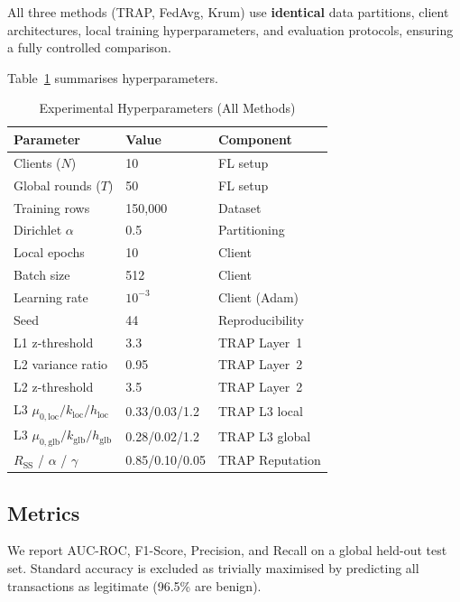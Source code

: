\documentclass[journal]{IEEEtran}
\newcommand{\sysname}{TRAP}
\begin{document}
All three methods (TRAP, FedAvg, Krum) use \textbf{identical} data
partitions, client architectures, local training hyperparameters, and
evaluation protocols, ensuring a fully controlled comparison.

Table~\ref{tab:hyperparams} summarises hyperparameters.

\begin{table}[!t]
\renewcommand{\arraystretch}{1.2}
\caption{Experimental Hyperparameters (All Methods)}
\label{tab:hyperparams}
\centering
\begin{tabular}{lll}
\toprule
\textbf{Parameter} & \textbf{Value} & \textbf{Component} \\
\midrule
Clients ($N$) & 10 & FL setup \\
Global rounds ($T$) & 50 & FL setup \\
Training rows & 150,000 & Dataset \\
Dirichlet $\alpha$ & 0.5 & Partitioning \\
Local epochs & 10 & Client \\
Batch size & 512 & Client \\
Learning rate & $10^{-3}$ & Client (Adam) \\
Seed & 44 & Reproducibility \\
\midrule
L1 z-threshold & 3.3 & \sysname{} Layer~1 \\
L2 variance ratio & 0.95 & \sysname{} Layer~2 \\
L2 z-threshold & 3.5 & \sysname{} Layer~2 \\
L3 $\mu_{0,\mathrm{loc}}/k_{\mathrm{loc}}/h_{\mathrm{loc}}$ & 0.33/0.03/1.2 & \sysname{} L3 local \\
L3 $\mu_{0,\mathrm{glb}}/k_{\mathrm{glb}}/h_{\mathrm{glb}}$ & 0.28/0.02/1.2 & \sysname{} L3 global \\
$R_{\mathrm{SS}}$ / $\alpha$ / $\gamma$ & 0.85/0.10/0.05 & \sysname{} Reputation \\
\bottomrule
\end{tabular}
\end{table}

\subsection{Metrics}
We report AUC-ROC, F1-Score, Precision, and Recall on a global held-out
test set. Standard accuracy is excluded as trivially maximised by predicting
all transactions as legitimate (96.5\% are benign).

\end{document}
